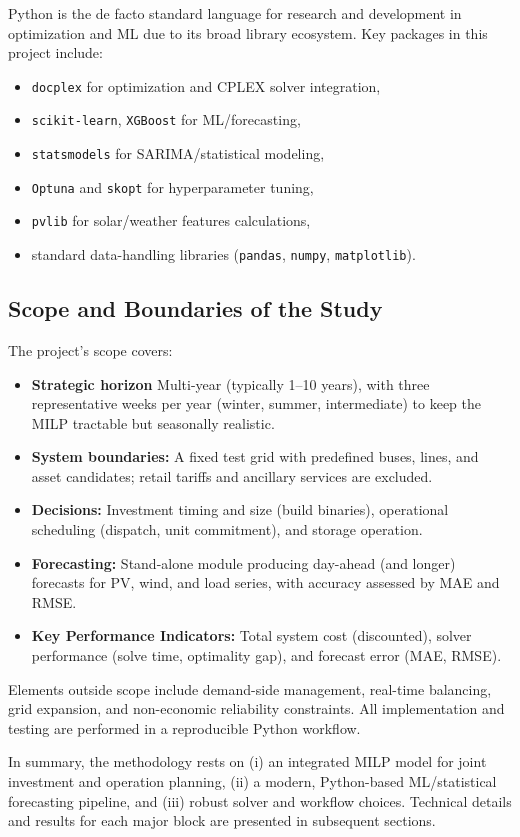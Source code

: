 Python is the de facto standard language for research and development in optimization and ML due to 
its broad library ecosystem. Key packages in this project include:
\begin{itemize}
    \item \texttt{docplex} for optimization and CPLEX solver integration,
    \item \texttt{scikit-learn}, \texttt{XGBoost} for ML/forecasting,
    \item \texttt{statsmodels} for SARIMA/statistical modeling,
    \item \texttt{Optuna} and \texttt{skopt} for hyperparameter tuning,
    \item \texttt{pvlib} for solar/weather features calculations,
    \item standard data-handling libraries (\texttt{pandas}, \texttt{numpy}, \texttt{matplotlib}).
\end{itemize}

\subsection{Scope and Boundaries of the Study}
The project’s scope covers:
\begin{itemize}
    \item \textbf{Strategic horizon} Multi-year (typically 1--10 years), with three representative 
    weeks per year (winter, summer, intermediate) to keep the MILP tractable but seasonally realistic.
    \item \textbf{System boundaries:} A fixed test grid with predefined buses, lines, and asset 
    candidates; retail tariffs and ancillary services are excluded.
    \item \textbf{Decisions:} Investment timing and size (build binaries), operational scheduling 
    (dispatch, unit commitment), and storage operation.
    \item \textbf{Forecasting:} Stand-alone module producing day-ahead (and longer) forecasts for 
    PV, wind, and load series, with accuracy assessed by MAE and RMSE.
    \item \textbf{Key Performance Indicators:} Total system cost (discounted), solver performance 
    (solve time, optimality gap), and forecast error (MAE, RMSE).
\end{itemize}

Elements outside scope include demand-side management, real-time balancing, grid expansion, and 
non-economic reliability constraints. All implementation and testing are performed in a reproducible 
Python workflow.

\vspace{1em}
\noindent
In summary, the methodology rests on (i) an integrated MILP model for joint investment and operation 
planning, (ii) a modern, Python-based ML/statistical forecasting pipeline, and (iii) robust solver and 
workflow choices. Technical details and results for each major block are presented in subsequent sections.